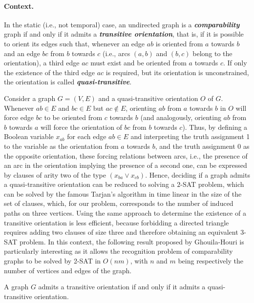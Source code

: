\documentclass[runningheads]{llncs}
\newcommand{\bfit}[1]{\textbf{\textit{#1}}}
\begin{document}
\paragraph*{Context.} In the static (i.e., not temporal)  case, an undirected graph is a \bfit{comparability} graph if and only if it admits a \bfit{transitive orientation}, that is, if it is possible to orient its edges such that, whenever an edge $ab$ is oriented from $a$ towards $b$ and an edge $bc$ from $b$ towards $c$ (i.e., arcs $(a,b)$ and $(b,c)$ belong to the orientation), a third edge $ac$ must exist and be oriented from $a$ towards $c$. If only the existence of the third edge $ac$ is required, but its orientation is unconstrained, the orientation is called \bfit{quasi-transitive}. 

Consider a graph $G=(V,E)$ and a quasi-transitive orientation $O$ of $G$.  Whenever $ab \in E$ and $bc \in E$ but $ac \notin E$, orienting $ab$ from $a$ towards $b$ in $O$ will force edge $bc$ to be oriented from $c$ towards $b$ (and analogously, orienting $ab$ from $b$ towards $a$ will force the orientation of $bc$ from $b$ towards $c$). Thus, by defining a Boolean variable $x_{ab}$ for each edge $ab \in E$ and interpreting the truth assignment 1 to the variable as the orientation from $a$ towards $b$, and the truth assignment 0 as the opposite orientation, these forcing relations between arcs, i.e., the presence of an arc in the orientation implying the presence of a second one, can be expressed by clauses of arity two of the type $(x_{ba} \lor x_{cb}) $. Hence, deciding if a graph admits a quasi-transitive orientation can be reduced to solving a $2$-SAT problem, which can be solved by the famous Tarjan's algorithm \cite{aspvall1979linear} in time linear in the size of the set of clauses, which, for our problem,  corresponds to the number of induced paths on three vertices. Using the same approach to determine the existence of a transitive orientation is less efficient, because forbidding a directed triangle requires adding two clauses of size three and therefore obtaining an equivalent 3-SAT problem. In this context, the following result proposed by Ghouila-Houri is particularly interesting as it allows the recognition problem of comparability graphs to be solved by 2-SAT in $O(nm)$, with $n$ and $m$ being respectively the number of vertices and edges of the graph.


\begin{theorem}\cite{GhouilaHouri}\label{theo:GH}
A graph $G$ admits a transitive orientation if and only if it admits a quasi-transitive orientation.
\end{theorem}
\end{document}

